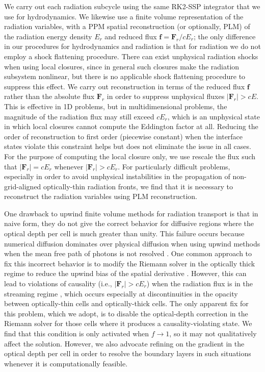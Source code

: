 \documentclass[fleqn,usenatbib]{mnras}
\begin{document}
We carry out each radiation subcycle using the same RK2-SSP integrator \citep{Shu_1988} that we use for hydrodynamics. We likewise use a finite volume representation of the radiation variables, with a PPM spatial reconstruction (or optionally, PLM) of the radiation energy density $E_r$ and reduced flux $\mathbf{f} = \mathbf{F}_r / cE_r$; the only difference in our procedures for hydrodynamics and radiation is that for radiation we do not employ a shock flattening procedure. There can exist unphysical radiation shocks when using local closures, since in general such closures make the radiation subsystem nonlinear, but there is no applicable shock flattening procedure to suppress this effect. We carry out reconstruction in terms of the reduced flux $\mathbf{f}$ rather than the absolute flux $\mathbf{F}_r$ in order to suppress unphysical fluxes $|\mathbf{F}_r| > cE$. This is effective in 1D problems, but in multidimensional problems, the magnitude of the radiation flux may still exceed $cE_r$, which is an unphysical state in which local closures cannot compute the Eddington factor at all. Reducing the order of reconstruction to first order (piecewise constant) when the interface states violate this constraint helps but does not eliminate the issue in all cases. For the purpose of computing the local closure only, we use rescale the flux such that $|\mathbf{F}_r| = cE_r$ whenever $|\mathbf{F}_r| > cE_r$.  For particularly difficult problems, especially in order to avoid unphysical instabilities in the propagation of non-grid-aligned optically-thin radiation fronts, we find that it is necessary to reconstruct the radiation variables using PLM reconstruction.

One drawback to upwind finite volume methods for radiation transport is that in naive form, they do not give the correct behavior for diffusive regions where the optical depth per cell is much greater than unity. This failure occurs because numerical diffusion dominates over physical diffusion when using upwind methods when the mean free path of photons is not resolved \citep{Lowrie_2001}. One common approach to fix this incorrect behavior is to modify the Riemann solver in the optically thick regime to reduce the upwind bias of the spatial derivative \citep{Audit_2002,Skinner_2019,Mezzacappa_2020}. However, this can lead to violations of causality (i.e., $|\mathbf{F}_r| > cE_r$) when the radiation flux is in the streaming regime \citep{Audit_2002}, which occurs especially at discontinuities in the opacity between optically-thin cells and optically-thick cells. The only apparent fix for this problem, which we adopt, is to disable the optical-depth correction in the Riemann solver for those cells where it produces a causality-violating state. We find that this condition is only activated when $f \rightarrow 1$, so it may not qualitatively affect the solution. However, we also advocate refining on the gradient in the optical depth per cell in order to resolve the boundary layers in such situations whenever it is computationally feasible.
\end{document}
